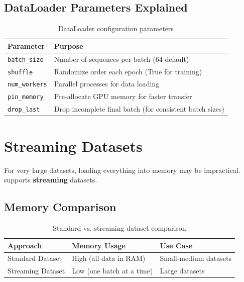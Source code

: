 \subsection{DataLoader Parameters Explained}

\begin{table}[H]
\centering
\begin{tabular}{lp{8cm}}
\toprule
\textbf{Parameter} & \textbf{Purpose} \\
\midrule
\texttt{batch\_size} & Number of sequences per batch (64 default) \\
\texttt{shuffle} & Randomize order each epoch (True for training) \\
\texttt{num\_workers} & Parallel processes for data loading \\
\texttt{pin\_memory} & Pre-allocate GPU memory for faster transfer \\
\texttt{drop\_last} & Drop incomplete final batch (for consistent batch sizes) \\
\bottomrule
\end{tabular}
\caption{DataLoader configuration parameters}
\end{table}

\section{Streaming Datasets}

For very large datasets, loading everything into memory may be impractical. \TryLM supports \textbf{streaming} datasets.

\subsection{Memory Comparison}

\begin{table}[H]
\centering
\begin{tabular}{lll}
\toprule
\textbf{Approach} & \textbf{Memory Usage} & \textbf{Use Case} \\
\midrule
Standard Dataset & High (all data in RAM) & Small-medium datasets \\
Streaming Dataset & Low (one batch at a time) & Large datasets \\
\bottomrule
\end{tabular}
\caption{Standard vs. streaming dataset comparison}
\end{table}

